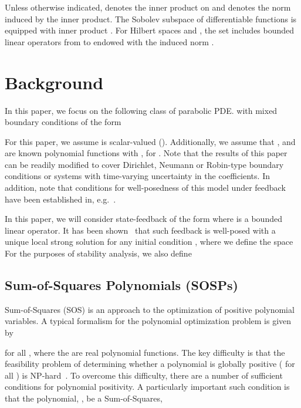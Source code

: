 \documentclass[9pt,journal,twocolumn]{IEEEtran}
\begin{document}
Unless otherwise indicated,  denotes the inner product on  and  denotes the norm induced by the inner product.
The Sobolev subspace of differentiable functions 
 is equipped with inner product . For Hilbert spaces  and , the set  includes bounded linear operators from  to  endowed with the induced norm .

\section{Background}\label{proset}
In this paper, we focus on the following class of parabolic PDE.
 with mixed boundary conditions of the form

 For this paper, we assume  is scalar-valued (). Additionally, we assume that ,  and  are known polynomial functions with , for . Note that the results of this paper can be readily modified to cover Dirichlet, Neumann or Robin-type boundary conditions or systems with time-varying uncertainty in the coefficients.
In addition, note that conditions for well-posedness of this model under feedback have been established in, e.g.~\cite{triggiani1980well,lasiecka1983feedback,lasiecka1980unified,lions1972non}.


In this paper, we will consider state-feedback of the form  where  is a bounded linear operator. It has been shown~\cite{fridman2009lmi} that such feedback is well-posed with a unique local strong solution for any initial condition , where we define the space
 For the purposes of stability analysis, we also define




\subsection{Sum-of-Squares Polynomials (SOSPs)}\label{SOS_sec}

Sum-of-Squares (SOS) is an approach to  the optimization of positive polynomial variables. A typical formalism for the polynomial optimization problem is given by

for all , where the  are real polynomial functions. The key difficulty is that the feasibility problem of determining whether a polynomial is globally positive ( for all ) is NP-hard~\cite{blum1998complexity}. To overcome this difficulty, there are a number of sufficient conditions for polynomial positivity. A particularly important such condition is that the polynomial, , be a Sum-of-Squares,
\end{document}
